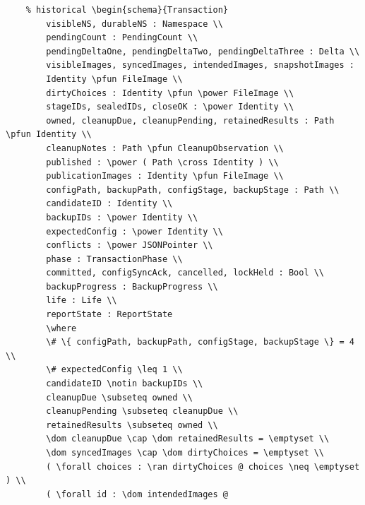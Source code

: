\documentclass{article}
\begin{document}
\begin{verbatim}
	% historical \begin{schema}{Transaction}
		visibleNS, durableNS : Namespace \\
		pendingCount : PendingCount \\
		pendingDeltaOne, pendingDeltaTwo, pendingDeltaThree : Delta \\
		visibleImages, syncedImages, intendedImages, snapshotImages :
		Identity \pfun FileImage \\
		dirtyChoices : Identity \pfun \power FileImage \\
		stageIDs, sealedIDs, closeOK : \power Identity \\
		owned, cleanupDue, cleanupPending, retainedResults : Path \pfun Identity \\
		cleanupNotes : Path \pfun CleanupObservation \\
		published : \power ( Path \cross Identity ) \\
		publicationImages : Identity \pfun FileImage \\
		configPath, backupPath, configStage, backupStage : Path \\
		candidateID : Identity \\
		backupIDs : \power Identity \\
		expectedConfig : \power Identity \\
		conflicts : \power JSONPointer \\
		phase : TransactionPhase \\
		committed, configSyncAck, cancelled, lockHeld : Bool \\
		backupProgress : BackupProgress \\
		life : Life \\
		reportState : ReportState
		\where
		\# \{ configPath, backupPath, configStage, backupStage \} = 4 \\
		\# expectedConfig \leq 1 \\
		candidateID \notin backupIDs \\
		cleanupDue \subseteq owned \\
		cleanupPending \subseteq cleanupDue \\
		retainedResults \subseteq owned \\
		\dom cleanupDue \cap \dom retainedResults = \emptyset \\
		\dom syncedImages \cap \dom dirtyChoices = \emptyset \\
		( \forall choices : \ran dirtyChoices @ choices \neq \emptyset ) \\
		( \forall id : \dom intendedImages @

\end{verbatim}
\end{document}
